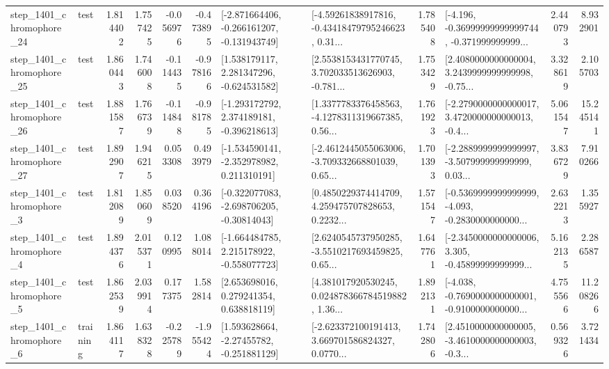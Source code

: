 \begin{tabular}{llrrrrllrlrr}
 step\_1401\_chromophore\_24 &      test &      1.814402 &    1.757425 &     -0.056976 & -0.473895 &  [-2.871664406, -0.266161207, -0.131943749] &  [-4.59261838917816, -0.43418479795246623, 0.31... &       1.785408 &  [-4.196, -0.36999999999999744, -0.371999999999... &            2.440793 &          8.932901 \\
 step\_1401\_chromophore\_25 &      test &      1.860443 &    1.746008 &     -0.114435 & -0.978166 &    [1.538179117, 2.281347296, -0.624531582] &  [2.5538153431770745, 3.702033513626903, -0.781... &       1.753429 &  [2.4080000000000004, 3.2439999999999998, -0.75... &            3.328619 &          2.105703 \\
 step\_1401\_chromophore\_26 &      test &      1.881587 &    1.766739 &     -0.114848 & -0.981785 &   [-1.293172792, 2.374189181, -0.396218613] &  [1.3377783376458563, -4.1278311319667385, 0.56... &       1.761923 &  [-2.2790000000000017, 3.4720000000000013, -0.4... &            5.061547 &         15.245141 \\
 step\_1401\_chromophore\_27 &      test &      1.892907 &    1.946215 &      0.053308 &  0.493979 &   [-1.534590141, -2.352978982, 0.211310191] &  [-2.4612445055063006, -3.709332668801039, 0.65... &       1.701393 &  [-2.2889999999999997, -3.507999999999999, 0.03... &            3.836729 &          7.910266 \\
  step\_1401\_chromophore\_3 &      test &      1.812089 &    1.850609 &      0.038520 &  0.364196 &   [-0.322077083, -2.698706205, -0.30814043] &  [0.4850229374414709, 4.259475707828653, 0.2232... &       1.571547 &  [-0.5369999999999999, -4.093, -0.2830000000000... &            2.632213 &          1.355927 \\
  step\_1401\_chromophore\_4 &      test &      1.894376 &    2.015371 &      0.120995 &  1.088014 &   [-1.664484785, 2.215178922, -0.558077723] &  [2.6240545737950285, -3.5510217693459825, 0.65... &       1.647761 &  [-2.3450000000000006, 3.305, -0.45899999999999... &            5.162135 &          2.286587 \\
  step\_1401\_chromophore\_5 &      test &      1.862539 &    2.039914 &      0.177375 &  1.582814 &     [2.653698016, 0.279241354, 0.638818119] &  [4.381017920530245, 0.024878366784519882, 1.36... &       1.892131 &  [-4.038, -0.7690000000000001, -0.9100000000000... &            4.755566 &         11.208266 \\
  step\_1401\_chromophore\_6 &  training &      1.864117 &    1.638328 &     -0.225789 & -1.955424 &    [1.593628664, -2.27455782, -0.251881129] &  [-2.623372100191413, 3.669701586824327, 0.0770... &       1.742806 &  [2.4510000000000005, -3.4610000000000003, -0.3... &            0.569326 &          3.721434 \\

\end{tabular}
